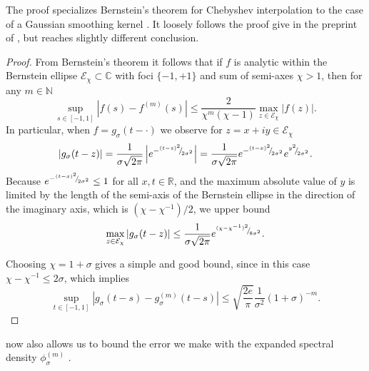 \documentclass[12pt]{article}
\begin{document}
The proof specializes Bernstein's theorem for Chebyshev interpolation to the case of a Gaussian smoothing kernel . It loosely follows the proof give in the preprint of \cite[theorem 2]{lin-2017-randomized-estimation}, but reaches slightly different conclusion.

\begin{proof}
    From Bernstein's theorem \cite[theorem 4.3]{trefethen-2008-gauss-quadrature} it follows that if $f$ is analytic within the Bernstein ellipse $\mathcal{E}_{\chi} \subset \mathbb{C}$ with foci $\{-1, +1\}$ and sum of semi-axes $\chi > 1$, then for any $m \in \mathbb{N}$
    \begin{equation}
        \sup_{s \in [-1, 1]} \left| f(s) - f^{(m)}(s) \right| \leq \frac{2}{\chi^m (\chi - 1)} \max_{z \in \mathcal{E}_{\chi}} |f(z)|.
        \label{equ:bernstein-bound}
    \end{equation}
    In particular, when $f = g_{\sigma}(t - \cdot)$ we observe for $z = x + iy \in \mathcal{E}_{\chi}$
    \begin{equation}
    | g_{\sigma}(t - z) | 
    = \frac{1}{\sigma \sqrt{2 \pi}} \left| e^{-{}^{(t - z)^2}{\mskip -5mu/\mskip -3mu}_{2\sigma^2}} \right|
    = \frac{1}{\sigma \sqrt{2 \pi}} e^{-{}^{(t - x)^2}{\mskip -5mu/\mskip -3mu}_{2\sigma^2}}e^{{}^{y^2}{\mskip -5mu/\mskip -3mu}_{2\sigma^2}}.
    \end{equation}
    Because $e^{-{}^{(t - x)^2}{\mskip -5mu/\mskip -3mu}_{2\sigma^2}} \leq 1$ for all $x, t \in \mathbb{R}$, and the maximum absolute value of $y$ is limited by the length of the semi-axis of the Bernstein ellipse in the direction of the imaginary axis, which is $(\chi - \chi^{-1}) / 2$, we upper bound
    \begin{equation}
        \max_{z \in \mathcal{E}_{\chi}} | g_{\sigma}(t - z) | 
        \leq \frac{1}{\sigma \sqrt{2 \pi}} e^{{}^{(\chi - \chi^{-1})^2}{\mskip -5mu/\mskip -3mu}_{8 \sigma^2}}.
    \end{equation}

    Choosing $\chi = 1 + \sigma$ gives a simple and good bound, since in this case $\chi - \chi^{-1} \leq 2\sigma$, which implies
    \begin{equation}
        \sup_{t \in [-1, 1]} \left| g_{\sigma}(t - s) - g_{\sigma}^{(m)}(t - s) \right| \leq \sqrt{\frac{2e}{\pi}} \frac{1}{\sigma^2} (1 + \sigma)^{-m}.
    \end{equation}
\end{proof}

 now also allows us to bound the error we make with the expanded spectral density $\phi_{\sigma}^{(m)}$ .
\end{document}
